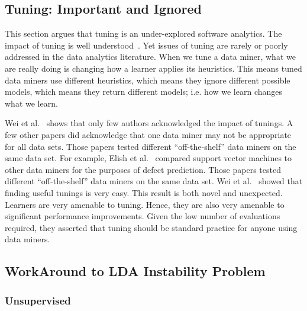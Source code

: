 \documentclass[conference]{IEEEtran}
\theoremstyle{break}
\begin{document}
\subsection{Tuning: Important and Ignored}
\label{sect: tuning}

This section argues that tuning is an under-explored software analytics. The impact of tuning is well understood~\cite{bergstra2012random}. Yet issues of tuning are rarely or poorly addressed in the data analytics literature. When we tune a data miner, what we are really doing is changing how a learner applies its heuristics. This means tuned data miners use different heuristics, which means they ignore different possible models, which means they return different models; i.e. how we learn changes what we learn.

Wei et al.~\cite{fu2016tuning} shows that only few authors acknowledged the impact of tunings. A few other papers did acknowledge that one data miner may not be appropriate for all data sets. Those papers tested different “off-the-shelf” data miners on the same data set. For
example, Elish et al.~\cite{elish2008predicting} compared support vector machines to other data miners for the purposes of defect prediction. Those papers tested different “off-the-shelf” data miners on the same data set. Wei et al.~\cite{fu2016tuning} showed that finding useful tunings is very easy. This result is both novel and unexpected. Learners are very amenable to tuning. Hence, they are also very amenable to significant performance improvements. Given the low number of evaluations required, they asserted that tuning should be standard practice for anyone using data miners.

\subsection{WorkAround to LDA Instability Problem}
\label{sect: solutions}

\subsubsection{\textbf{Unsupervised}}
\hfill

\noindent{}
\end{document}
